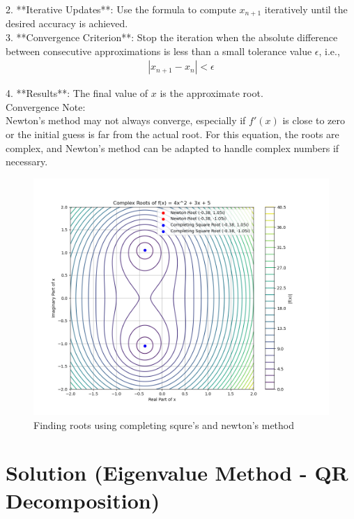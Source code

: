 \documentclass[journal]{IEEEtran}
\begin{document}
2. **Iterative Updates**: Use the formula to compute \( x_{n+1} \) iteratively until the desired accuracy is achieved.\\

3. **Convergence Criterion**: Stop the iteration when the absolute difference between consecutive approximations is less than a small tolerance value \( \epsilon \), i.e.,\\

\begin{align}
|x_{n+1} - x_n| < \epsilon
\end{align}

4. **Results**: The final value of \( x \) is the approximate root.\\

 Convergence Note:\\ 

Newton's method may not always converge, especially if \( f'(x) \) is close to zero or the initial guess is far from the actual root. For this equation, the roots are complex, and Newton's method can be adapted to handle complex numbers if necessary.


		\begin{figure}[h!]
		\centering
		\includegraphics[width=\columnwidth]{figs/fig2.png}
			\caption{Finding roots using completing squre's and newton's method}
		\label{stemplot}
	\end{figure}
\section*{Solution (Eigenvalue Method - QR Decomposition)}
\end{document}
